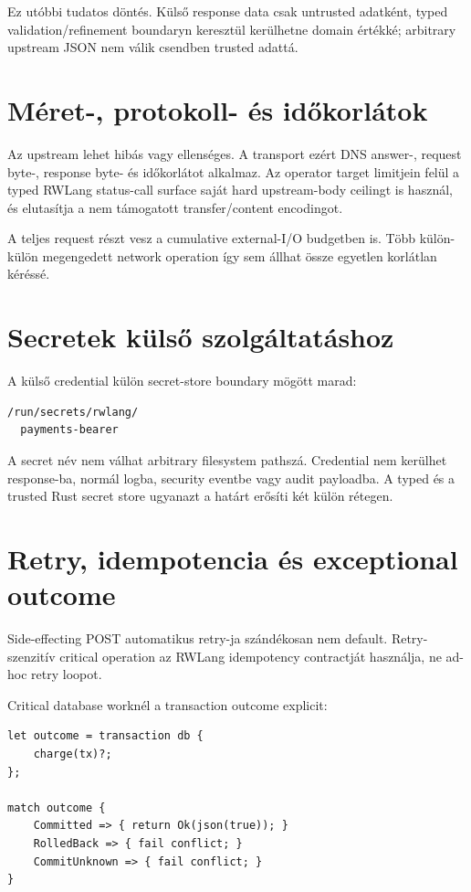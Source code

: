 Ez utóbbi tudatos döntés. Külső response data csak untrusted adatként, typed validation/refinement boundaryn keresztül kerülhetne domain értékké; arbitrary upstream JSON nem válik csendben trusted adattá.

\section{Méret-, protokoll- és időkorlátok}

Az upstream lehet hibás vagy ellenséges. A transport ezért DNS answer-, request byte-, response byte- és időkorlátot alkalmaz. Az operator target limitjein felül a typed RWLang status-call surface saját hard upstream-body ceilingt is használ, és elutasítja a nem támogatott transfer/content encodingot.

A teljes request részt vesz a cumulative external-I/O budgetben is. Több külön-külön megengedett network operation így sem állhat össze egyetlen korlátlan kéréssé.

\section{Secretek külső szolgáltatáshoz}

A külső credential külön secret-store boundary mögött marad:

\begin{lstlisting}
/run/secrets/rwlang/
  payments-bearer
\end{lstlisting}

A secret név nem válhat arbitrary filesystem pathszá. Credential nem kerülhet response-ba, normál logba, security eventbe vagy audit payloadba. A typed  és a trusted Rust secret store ugyanazt a határt erősíti két külön rétegen.

\section{Retry, idempotencia és exceptional outcome}

Side-effecting POST automatikus retry-ja szándékosan nem default. Retry-szenzitív critical operation az RWLang idempotency contractját használja, ne ad-hoc retry loopot.

Critical database worknél a transaction outcome explicit:

\begin{lstlisting}[language=RWLang]
let outcome = transaction db {
    charge(tx)?;
};

match outcome {
    Committed => { return Ok(json(true)); }
    RolledBack => { fail conflict; }
    CommitUnknown => { fail conflict; }
}
\end{lstlisting}

